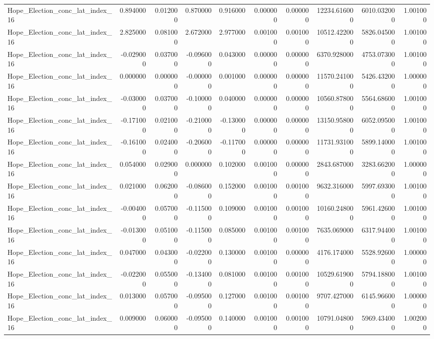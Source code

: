 \begin{table}
\begin{tabular}{lrrrrrrrrr}
Hope_Election_conc_lat_index_16 & 0.894000 & 0.012000 & 0.870000 & 0.916000 & 0.000000 & 0.000000 & 12234.616000 & 6010.032000 & 1.001000 \\
Hope_Election_conc_lat_index_16 & 2.825000 & 0.081000 & 2.672000 & 2.977000 & 0.001000 & 0.001000 & 10512.422000 & 5826.045000 & 1.001000 \\
Hope_Election_conc_lat_index_16 & -0.029000 & 0.037000 & -0.096000 & 0.043000 & 0.000000 & 0.000000 & 6370.928000 & 4753.073000 & 1.001000 \\
Hope_Election_conc_lat_index_16 & 0.000000 & 0.000000 & -0.000000 & 0.001000 & 0.000000 & 0.000000 & 11570.241000 & 5426.432000 & 1.000000 \\
Hope_Election_conc_lat_index_16 & -0.030000 & 0.037000 & -0.100000 & 0.040000 & 0.000000 & 0.000000 & 10560.878000 & 5564.686000 & 1.001000 \\
Hope_Election_conc_lat_index_16 & -0.171000 & 0.021000 & -0.210000 & -0.130000 & 0.000000 & 0.000000 & 13150.958000 & 6052.095000 & 1.001000 \\
Hope_Election_conc_lat_index_16 & -0.161000 & 0.024000 & -0.206000 & -0.117000 & 0.000000 & 0.000000 & 11731.931000 & 5899.140000 & 1.001000 \\
Hope_Election_conc_lat_index_16 & 0.054000 & 0.029000 & 0.000000 & 0.102000 & 0.001000 & 0.000000 & 2843.687000 & 3283.662000 & 1.000000 \\
Hope_Election_conc_lat_index_16 & 0.021000 & 0.062000 & -0.086000 & 0.152000 & 0.001000 & 0.001000 & 9632.316000 & 5997.693000 & 1.001000 \\
Hope_Election_conc_lat_index_16 & -0.004000 & 0.057000 & -0.115000 & 0.109000 & 0.001000 & 0.001000 & 10160.248000 & 5961.426000 & 1.001000 \\
Hope_Election_conc_lat_index_16 & -0.013000 & 0.051000 & -0.115000 & 0.085000 & 0.001000 & 0.001000 & 7635.069000 & 6317.944000 & 1.001000 \\
Hope_Election_conc_lat_index_16 & 0.047000 & 0.043000 & -0.022000 & 0.130000 & 0.001000 & 0.000000 & 4176.174000 & 5528.926000 & 1.000000 \\
Hope_Election_conc_lat_index_16 & -0.022000 & 0.055000 & -0.134000 & 0.081000 & 0.001000 & 0.001000 & 10529.619000 & 5794.188000 & 1.001000 \\
Hope_Election_conc_lat_index_16 & 0.013000 & 0.057000 & -0.095000 & 0.127000 & 0.001000 & 0.001000 & 9707.427000 & 6145.966000 & 1.000000 \\
Hope_Election_conc_lat_index_16 & 0.009000 & 0.060000 & -0.095000 & 0.140000 & 0.001000 & 0.001000 & 10791.048000 & 5969.434000 & 1.002000 \\

\end{tabular}
\end{table}
